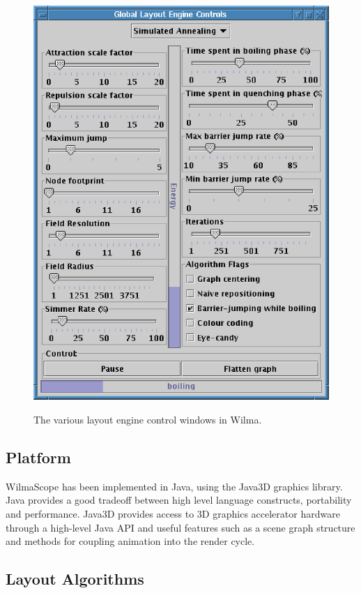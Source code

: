 \documentclass[runningheads]{cl2emult}
\begin{document}
\begin{figure}
{{    \includegraphics{figures/wilma-simannealcontrols.eps}}}
  \caption{The various layout engine control windows in Wilma.}
\end{figure}

\subsection{Platform}

WilmaScope has been implemented in Java, using the Java3D graphics library.
Java provides a good tradeoff between high level language constructs,
portability and performance.  Java3D provides access to 3D graphics accelerator hardware through
a high-level Java API and useful features such as a scene graph
structure and methods for coupling animation into the render cycle.

\subsection{Layout Algorithms}
\end{document}
